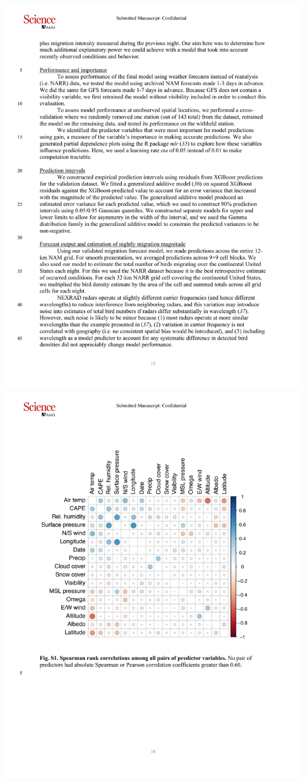 \documentclass[a4paper, twoside]{templates/ociamthesis}
\begin{document}
\includegraphics[width=1\linewidth]{pdf_chapters/forecast/forecast_supp_crop_Part5}
\includegraphics[width=1\linewidth]{pdf_chapters/forecast/forecast_supp_crop_Part6}
\end{document}
